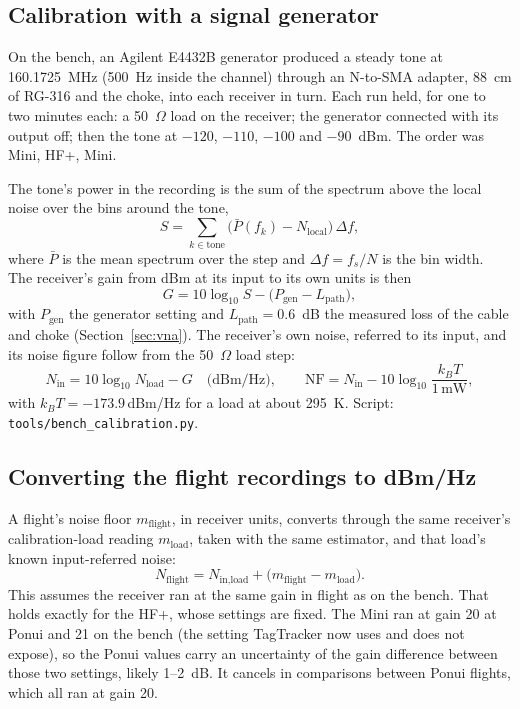 \documentclass[11pt]{article}
\newcommand{\dBmHz}{\,dBm/Hz}
\begin{document}
\subsection{Calibration with a signal generator}
\label{sec:calmethod}
On the bench, an Agilent E4432B generator produced a steady tone at 160.1725~MHz (500~Hz inside the
channel) through an N-to-SMA adapter, 88~cm of RG-316 and the choke, into each receiver in turn.
Each run held, for one to two minutes each: a 50~$\Omega$ load on the receiver; the generator
connected with its output off; then the tone at $-120$, $-110$, $-100$ and $-90$~dBm. The order was
Mini, HF+, Mini.

The tone's power in the recording is the sum of the spectrum above the local noise over the bins
around the tone,
\begin{equation}
S = \sum_{k\in\text{tone}}\bigl(\bar P(f_k) - N_\text{local}\bigr)\,\Delta f ,
\end{equation}
where $\bar P$ is the mean spectrum over the step and $\Delta f = f_s/N$ is the bin width. The
receiver's gain from dBm at its input to its own units is then
\begin{equation}
G = 10\log_{10} S - \bigl(P_\text{gen} - L_\text{path}\bigr),
\end{equation}
with $P_\text{gen}$ the generator setting and $L_\text{path} = 0.6$~dB the measured loss of the cable
and choke (Section~\ref{sec:vna}). The receiver's own noise, referred to its input, and its noise
figure follow from the 50~$\Omega$ load step:
\begin{equation}
N_\text{in} = 10\log_{10} N_\text{load} - G \quad\text{(dBm/Hz)},\qquad
\text{NF} = N_\text{in} - 10\log_{10}\!\frac{k_B T}{1\,\text{mW}},
\end{equation}
with $k_B T = -173.9$\dBmHz{} for a load at about 295~K. Script:
\texttt{tools/bench\_calibration.py}.

\subsection{Converting the flight recordings to dBm/Hz}
\label{sec:flightconv}
A flight's noise floor $m_\text{flight}$, in receiver units, converts through the same receiver's
calibration-load reading $m_\text{load}$, taken with the same estimator, and that load's known
input-referred noise:
\begin{equation}
N_\text{flight} = N_\text{in,load} + \bigl(m_\text{flight} - m_\text{load}\bigr).
\end{equation}
This assumes the receiver ran at the same gain in flight as on the bench. That holds exactly for
the HF+, whose settings are fixed. The Mini ran at gain 20 at Ponui and 21 on the bench (the setting
TagTracker now uses and does not expose), so the Ponui values carry an uncertainty of the gain
difference between those two settings, likely 1--2~dB. It cancels in comparisons between Ponui
flights, which all ran at gain 20.
\end{document}
